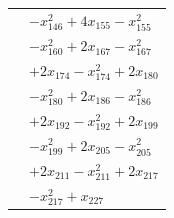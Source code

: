 \begin{longtable}{@{}r@{\;}l@{}}
 & \(\displaystyle -x_{146}^{2} +4x_{155} -x_{155}^{2}\) \\
 & \(\displaystyle -x_{160}^{2} +2x_{167} -x_{167}^{2}\) \\
 & \(\displaystyle +2x_{174} -x_{174}^{2} +2x_{180}\) \\
 & \(\displaystyle -x_{180}^{2} +2x_{186} -x_{186}^{2}\) \\
 & \(\displaystyle +2x_{192} -x_{192}^{2} +2x_{199}\) \\
 & \(\displaystyle -x_{199}^{2} +2x_{205} -x_{205}^{2}\) \\
 & \(\displaystyle +2x_{211} -x_{211}^{2} +2x_{217}\) \\
 & \(\displaystyle -x_{217}^{2} +x_{227}\) \\[3pt]
\end{longtable}
\endgroup
